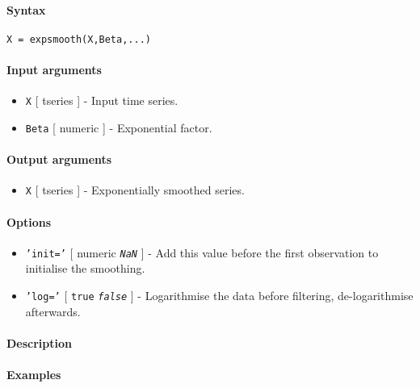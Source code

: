 


	\paragraph{Syntax}\label{syntax}

\begin{verbatim}
X = expsmooth(X,Beta,...)
\end{verbatim}

\paragraph{Input arguments}\label{input-arguments}

\begin{itemize}
\item
  \texttt{X} {[} tseries {]} - Input time series.
\item
  \texttt{Beta} {[} numeric {]} - Exponential factor.
\end{itemize}

\paragraph{Output arguments}\label{output-arguments}

\begin{itemize}
\itemsep1pt\parskip0pt
\item
  \texttt{X} {[} tseries {]} - Exponentially smoothed series.
\end{itemize}

\paragraph{Options}\label{options}

\begin{itemize}
\item
  \texttt{'init='} {[} numeric \textbar{} \emph{\texttt{NaN}} {]} - Add
  this value before the first observation to initialise the smoothing.
\item
  \texttt{'log='} {[} \texttt{true} \textbar{} \emph{\texttt{false}} {]}
  - Logarithmise the data before filtering, de-logarithmise afterwards.
\end{itemize}

\paragraph{Description}\label{description}

\paragraph{Examples}\label{examples}


